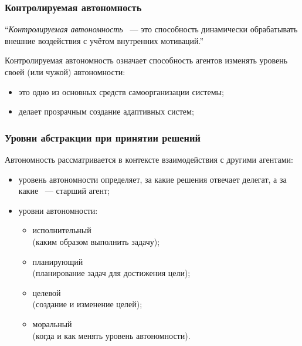\documentclass{beamer}
\begin{document}
\begin{frame}
  \frametitle{Контролируемая автономность}
  \begin{exampleblock}{}
    {\large ``{\it Контролируемая автономность} ~--- это способность динамически
    обрабатывать внешние воздействия с учётом внутренних мотиваций.''}
    \vskip5mm
    \hspace*{}
  \end{exampleblock}

  Контролируемая автономность означает способность агентов изменять
  уровень своей (или чужой) автономности:
  \begin{itemize}
    \item это одно из основных средств самоорганизации системы;
    \item делает прозрачным создание адаптивных систем;
  \end{itemize}
\end{frame}

\begin{frame}
  \frametitle{Уровни абстракции при принятии решений}
  Автономность рассматривается в контексте взаимодействия с другими агентами:
  \begin{itemize}
    \item уровень автономности определяет, за какие решения отвечает делегат, а за какие ~--- старший агент;
    \item уровни автономности:
      \begin{itemize}
        \item исполнительный \\ (каким образом выполнить задачу);
        \item планирующий \\ (планирование задач для достижения цели);
        \item целевой \\ (создание и изменение целей);
        \item моральный \\ (когда и как менять уровень автономности).
      \end{itemize}
  \end{itemize}
\end{frame}
\end{document}
